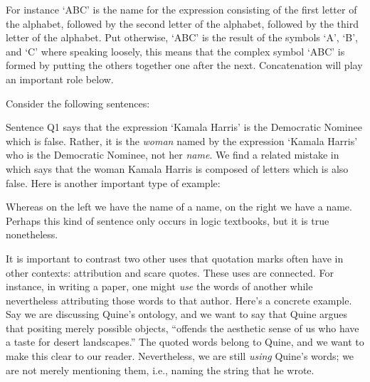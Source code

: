 
For instance `ABC' is the name for the expression consisting of the first letter of the alphabet, followed by the second letter of the alphabet, followed by the third letter of the alphabet.
Put otherwise, `ABC' is the result of  the symbols `A', `B', and `C' where speaking loosely, this means that the complex symbol `ABC' is formed by putting the others together one after the next.
Concatenation will play an important role below. 

Consider the following sentences:

\begin{earg}
\end{earg}

Sentence Q1 says that the expression `Kamala Harris' is the Democratic Nominee which is false.
Rather, it is the \textit{woman} named by the expression `Kamala Harris' who is the Democratic Nominee, not her \textit{name}.
We find a related mistake in  which says that the woman Kamala Harris is composed of letters which is also false. %
Here is another important type of example:

  \begin{earg}
  \end{earg}

Whereas on the left we have the name of a name, on the right we have a name.
Perhaps this kind of sentence only occurs in logic textbooks, but it is true nonetheless.

It is important to contrast two other uses that quotation marks often have in other contexts: attribution and scare quotes.
These uses are connected.
For instance, in writing a paper, one might \textit{use} the words of another while nevertheless attributing those words to that author.
Here's a concrete example.
Say we are discussing Quine's ontology, and we want to say that Quine argues that positing merely possible objects, ``offends the aesthetic sense of us who have a taste for desert landscapes.''
The quoted words belong to Quine, and we want to make this clear to our reader.
Nevertheless, we are still \textit{using} Quine's words; we are not merely mentioning them, i.e., naming the string that he wrote.

